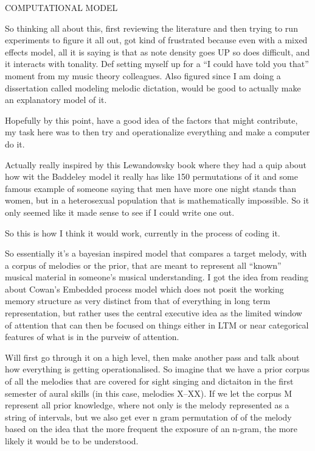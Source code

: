 \documentclass[]{book}
\theoremstyle{definition}
\theoremstyle{definition}
\theoremstyle{definition}
\theoremstyle{remark}
\begin{document}
COMPUTATIONAL MODEL

So thinking all about this, first reviewing the literature and then
trying to run experiments to figure it all out, got kind of frustrated
because even with a mixed effects model, all it is saying is that as
note density goes UP so does difficult, and it interacts with tonality.
Def setting myself up for a ``I could have told you that'' moment from
my music theory colleagues. Also figured since I am doing a dissertation
called modeling melodic dictation, would be good to actually make an
explanatory model of it.

Hopefully by this point, have a good idea of the factors that might
contribute, my task here was to then try and operationalize everything
and make a computer do it.

Actually really inspired by this Lewandowsky book where they had a quip
about how wit the Baddeley model it really has like 150 permutations of
it and some famous example of someone saying that men have more one
night stands than women, but in a heterosexual population that is
mathematically impossible. So it only seemed like it made sense to see
if I could write one out.

So this is how I think it would work, currently in the process of coding
it.

So essentially it's a bayesian inspired model that compares a target
melody, with a corpus of melodies or the prior, that are meant to
represent all ``known'' musical material in someone's musical
understanding. I got the idea from reading about Cowan's Embedded
process model which does not posit the working memory structure as very
distinct from that of everything in long term representation, but rather
uses the central executive idea as the limited window of attention that
can then be focused on things either in LTM or near categorical features
of what is in the purveiw of attention.

Will first go through it on a high level, then make another pass and
talk about how everything is getting operationalised. So imagine that we
have a prior corpus of all the melodies that are covered for sight
singing and dictaiton in the first semester of aural skills (in this
case, melodies X--XX). If we let the corpus M represent all prior
knowledge, where not only is the melody represented as a string of
intervals, but we also get ever n gram permutation of of the melody
based on the idea that the more frequent the exposure of an n-gram, the
more likely it would be to be understood.
\end{document}
